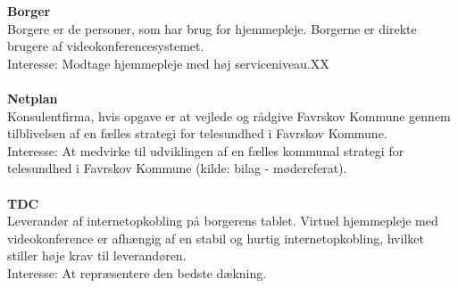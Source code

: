 \textbf{Borger}\\
Borgere er de personer, som har brug for hjemmepleje. Borgerne er direkte brugere af videokonferencesystemet.\\
Interesse: Modtage hjemmepleje med høj serviceniveau.XX\\ \\
\textbf{Netplan}\\
Konsulentfirma\cite{netplan}, hvis opgave er at vejlede og rådgive Favrskov Kommune gennem tilblivelsen af en fælles strategi for telesundhed i Favrskov Kommune.\\
Interesse: At medvirke til udviklingen af en fælles kommunal strategi for telesundhed i Favrskov Kommune (kilde: bilag - mødereferat).\\ \\
\textbf{TDC}\\
Leverandør af internetopkobling på borgerens tablet. Virtuel hjemmepleje med videokonference er afhængig af en stabil og hurtig internetopkobling, hvilket stiller høje krav til leverandøren. \\
Interesse: At repræsentere den bedste dækning.
